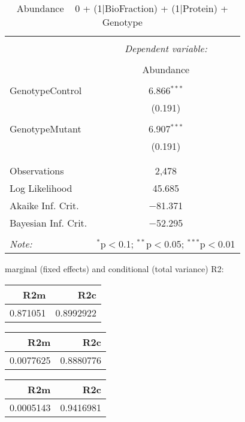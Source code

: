 \documentclass[11pt]{report}
\begin{document}
\begin{table}[!htbp] \centering 
  \caption{Abundance ~ 0 + (1|BioFraction) + (1|Protein) + Genotype} 
  \label{} 
\begin{tabular}{@{\extracolsep{5pt}}lc} 
\\[-1.8ex]\hline 
\hline \\[-1.8ex] 
 & \multicolumn{1}{c}{\textit{Dependent variable:}} \\ 
\cline{2-2} 
\\[-1.8ex] & Abundance \\ 
\hline \\[-1.8ex] 
 GenotypeControl & 6.866$^{***}$ \\ 
  & (0.191) \\ 
  & \\ 
 GenotypeMutant & 6.907$^{***}$ \\ 
  & (0.191) \\ 
  & \\ 
\hline \\[-1.8ex] 
Observations & 2,478 \\ 
Log Likelihood & 45.685 \\ 
Akaike Inf. Crit. & $-$81.371 \\ 
Bayesian Inf. Crit. & $-$52.295 \\ 
\hline 
\hline \\[-1.8ex] 
\textit{Note:}  & \multicolumn{1}{r}{$^{*}$p$<$0.1; $^{**}$p$<$0.05; $^{***}$p$<$0.01} \\ 
\end{tabular} 
\end{table} 
marginal (fixed effects) and conditional (total variance) R2:

\begin{tabular}{r|r}
\hline
R2m & R2c\\
\hline
0.871051 & 0.8992922\\
\hline
\end{tabular}

\begin{tabular}{r|r}
\hline
R2m & R2c\\
\hline
0.0077625 & 0.8880776\\
\hline
\end{tabular}

\begin{tabular}{r|r}
\hline
R2m & R2c\\
\hline
0.0005143 & 0.9416981\\
\hline
\end{tabular}
\end{document}
